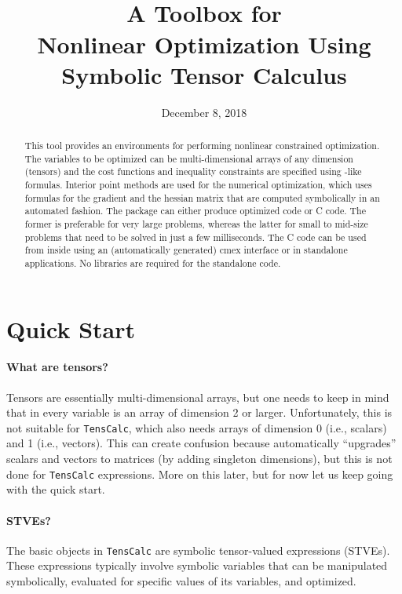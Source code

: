 \documentclass[11pt]{article}
\title{\sc \TC \\[1em]\Large A \matlab{} Toolbox for \\
  Nonlinear Optimization Using Symbolic Tensor Calculus}
\author{\jph}
\date{December 8, 2018}
\newcommand{\TC}{\texttt{TensCalc}}
\theoremstyle{remark}
\begin{document}
                        \maketitle

\begin{abstract}
  This tool provides an environments for performing nonlinear
  constrained optimization. The variables to be optimized can be
  multi-dimensional arrays of any dimension (tensors) and the cost
  functions and inequality constraints are specified using
  \matlab-like formulas. Interior point methods are used for the
  numerical optimization, which uses formulas for the gradient and the
  hessian matrix that are computed symbolically in an automated
  fashion.  The package can either produce optimized \matlab{} code or
  C code. The former is preferable for very large problems, whereas
  the latter for small to mid-size problems that need to be solved in
  just a few milliseconds. The C code can be used from inside
  \matlab{} using an (automatically generated) cmex interface or in
  standalone applications. No libraries are required for the
  standalone code.
\end{abstract}

\newpage

\tableofcontents

\newpage

\section{Quick Start}

\paragraph{What are tensors?} Tensors are essentially multi-dimensional arrays,
but one needs to keep in mind that in \matlab{} every variable is an
array of dimension 2 or larger. Unfortunately, this is not suitable
for \TC{}, which also needs arrays of dimension 0 (i.e., scalars) and
1 (i.e., vectors). This can create confusion because \matlab{}
automatically ``upgrades'' scalars and vectors to matrices (by adding
singleton dimensions), but this is not done for \TC{}
expressions. More on this later, but for now let us keep going with
the quick start.

\paragraph{STVEs?} The basic objects in \TC{} are symbolic
tensor-valued expressions (STVEs). These expressions typically involve
symbolic variables that can be manipulated symbolically, evaluated for
specific values of its variables, and optimized.
\end{document}
